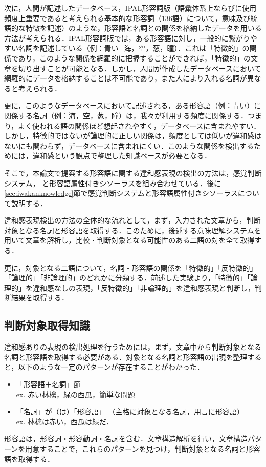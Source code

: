 \documentclass[japanese]{jnlp_1.4}
\begin{document}
次に，人間が記述したデータベース，IPAL形容詞版（語彙体系上ならびに使用頻度上重要であると考えられる基本的な形容詞（136語）について，意味及び統語的な特徴を記述）のような，形容語と名詞との関係を格納したデータを用いる方法が考えられる．IPAL形容詞版では，ある形容語に対し，一般的に繋がりやすい名詞を記述している（例：青い−海，空，葱，瞳）．これは「特徴的」の関係であり，このような関係を網羅的に把握することができれば，「特徴的」の文章を切り出すことが可能となる．しかし，人間が作成したデータベースにおいて網羅的にデータを格納することは不可能であり，また人により入れる名詞が異なると考えられる．

更に，このようなデータベースにおいて記述される，ある形容語（例：青い）に関係する名詞（例：海，空，葱，瞳）は，我々が利用する頻度に関係する．つまり，よく使われる語の関係ほど想起されやすく，データベースに含まれやすい．しかし，特徴的ではないが論理的に正しい関係は，頻度としては低いが違和感はないにも関わらず，データベースに含まれにくい．このような関係を検出するためには，違和感という観点で整理した知識ベースが必要となる．

そこで，本論文で提案する形容語に関する違和感表現の検出の方法は，感覚判断システム\cite{Watabe2004}， \cite{Kometani2003}と形容語属性付きシソーラスを組み合わせている．後に\ref{sec:iwakanknowledge}節で感覚判断システムと形容語属性付きシソーラスについて説明する．

違和感表現検出の方法の全体的な流れとして，まず，入力された文章から，判断対象となる名詞と形容語を取得する．このために，後述する意味理解システムを用いて文章を解析し，比較・判断対象となる可能性のある二語の対を全て取得する．

更に，対象となる二語について，名詞・形容語の関係を「特徴的」「反特徴的」「論理的」「非論理的」のどれかに分類する．前述した実験より，「特徴的」「論理的」を違和感なしの表現，「反特徴的」「非論理的」を違和感表現と判断し，判断結果を取得する．

\subsection{判断対象取得知識}

違和感ありの表現の検出処理を行うためには，まず，文章中から判断対象となる名詞と形容語を取得する必要がある．対象となる名詞と形容語の出現を整理すると，以下のような一定のパターンが存在することがわかった．
\begin{itemize}
	\item 「形容語＋名詞」節\\
		ex. 赤い林檎，緑の西瓜，簡単な問題
	\item 「名詞」が（は）「形容語」 （主格に対象となる名詞，用言に形容語）\\
		ex. 林檎は赤い，西瓜は緑だ． 
\end{itemize}
形容語は，形容詞・形容動詞・名詞を含む．文章構造解析を行い，文章構造パターンを用意することで，これらのパターンを見つけ，判断対象となる名詞と形容語を取得する．
\end{document}

